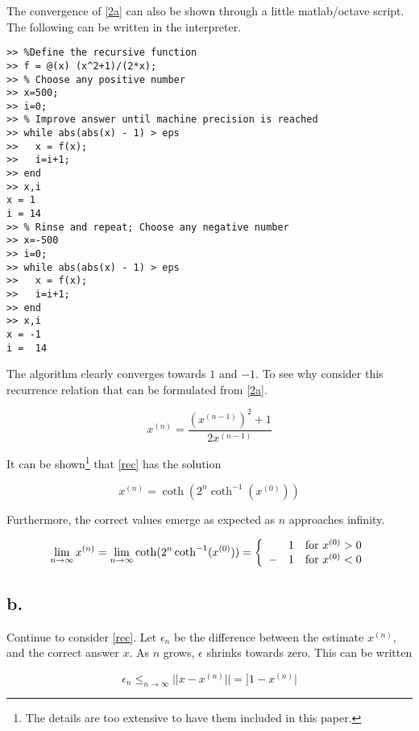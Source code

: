 \documentclass[00-main.tex]{subfiles}
\begin{document}
The convergence of \cref{2a} can also be shown through a little matlab/octave script. The following can be written in the interpreter.

\begin{verbatim}
>> %Define the recursive function
>> f = @(x) (x^2+1)/(2*x);
>> % Choose any positive number
>> x=500;
>> i=0;
>> % Improve answer until machine precision is reached
>> while abs(abs(x) - 1) > eps
>>   x = f(x);
>>   i=i+1;
>> end
>> x,i
x = 1
i = 14
>> % Rinse and repeat; Choose any negative number
>> x=-500
>> i=0;
>> while abs(abs(x) - 1) > eps
>>   x = f(x);
>>   i=i+1;
>> end
>> x,i
x = -1
i =  14
\end{verbatim}

The algorithm clearly converges towards $1$ and $-1$. To see why consider this recurrence relation that can be formulated from \cref{2a}.

\begin{equation}
\label{rec}
x^{(n)} = \frac{(x^{(n-1)})^2 + 1}{2x^{(n-1)}}
\end{equation}

It can be shown\footnote{The details are too extensive to have them included in this paper.} that \cref{rec} has the solution

\begin{equation}
x^{(n)} = \coth(2^n \coth^{-1}(x^{(0)}))
\end{equation}

Furthermore, the correct values emerge as expected as $n$ approaches infinity.

\begin{equation}
\lim_{n \rightarrow \infty} x^{(n)} = \lim_{n \rightarrow \infty} \coth(2^n \coth^{-1}(x^{(0)})) = 
\left\{ \begin{array}{lll}
	&1 & {\rm for} ~x^{(0)} > 0 \\
   -&1 & {\rm for} ~x^{(0)} < 0
\end{array} \right.
\end{equation}

\subsection*{b.}
Continue to consider \cref{rec}. 
Let $\epsilon_n$ be the difference between the estimate $x^{(n)}$, and the correct answer $x$. As $n$ grows, $\epsilon$ shrinks towards zero. This can be written

\begin{equation}
\epsilon_n \leq_{n \rightarrow \infty} ||x-x^{(n)}|| = ]1 - x^{(n)}|
\end{equation}
\end{document}
